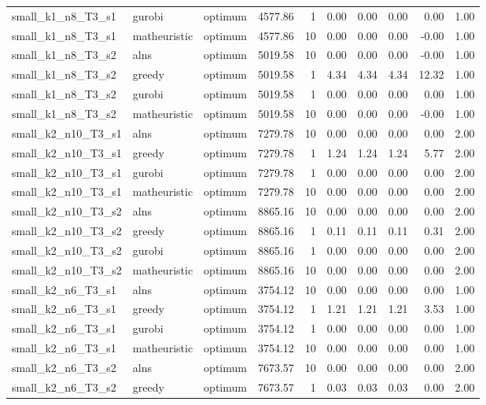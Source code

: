 \begin{tabular}{lllrrrrrrr}
small\_k1\_n8\_T3\_s1 & gurobi & optimum & 4577.86 & 1 & 0.00 & 0.00 & 0.00 & 0.00 & 1.00 \\
small\_k1\_n8\_T3\_s1 & matheuristic & optimum & 4577.86 & 10 & 0.00 & 0.00 & 0.00 & -0.00 & 1.00 \\
small\_k1\_n8\_T3\_s2 & alns & optimum & 5019.58 & 10 & 0.00 & 0.00 & 0.00 & -0.00 & 1.00 \\
small\_k1\_n8\_T3\_s2 & greedy & optimum & 5019.58 & 1 & 4.34 & 4.34 & 4.34 & 12.32 & 1.00 \\
small\_k1\_n8\_T3\_s2 & gurobi & optimum & 5019.58 & 1 & 0.00 & 0.00 & 0.00 & 0.00 & 1.00 \\
small\_k1\_n8\_T3\_s2 & matheuristic & optimum & 5019.58 & 10 & 0.00 & 0.00 & 0.00 & -0.00 & 1.00 \\
small\_k2\_n10\_T3\_s1 & alns & optimum & 7279.78 & 10 & 0.00 & 0.00 & 0.00 & 0.00 & 2.00 \\
small\_k2\_n10\_T3\_s1 & greedy & optimum & 7279.78 & 1 & 1.24 & 1.24 & 1.24 & 5.77 & 2.00 \\
small\_k2\_n10\_T3\_s1 & gurobi & optimum & 7279.78 & 1 & 0.00 & 0.00 & 0.00 & 0.00 & 2.00 \\
small\_k2\_n10\_T3\_s1 & matheuristic & optimum & 7279.78 & 10 & 0.00 & 0.00 & 0.00 & 0.00 & 2.00 \\
small\_k2\_n10\_T3\_s2 & alns & optimum & 8865.16 & 10 & 0.00 & 0.00 & 0.00 & 0.00 & 2.00 \\
small\_k2\_n10\_T3\_s2 & greedy & optimum & 8865.16 & 1 & 0.11 & 0.11 & 0.11 & 0.31 & 2.00 \\
small\_k2\_n10\_T3\_s2 & gurobi & optimum & 8865.16 & 1 & 0.00 & 0.00 & 0.00 & 0.00 & 2.00 \\
small\_k2\_n10\_T3\_s2 & matheuristic & optimum & 8865.16 & 10 & 0.00 & 0.00 & 0.00 & 0.00 & 2.00 \\
small\_k2\_n6\_T3\_s1 & alns & optimum & 3754.12 & 10 & 0.00 & 0.00 & 0.00 & 0.00 & 1.00 \\
small\_k2\_n6\_T3\_s1 & greedy & optimum & 3754.12 & 1 & 1.21 & 1.21 & 1.21 & 3.53 & 1.00 \\
small\_k2\_n6\_T3\_s1 & gurobi & optimum & 3754.12 & 1 & 0.00 & 0.00 & 0.00 & 0.00 & 1.00 \\
small\_k2\_n6\_T3\_s1 & matheuristic & optimum & 3754.12 & 10 & 0.00 & 0.00 & 0.00 & 0.00 & 1.00 \\
small\_k2\_n6\_T3\_s2 & alns & optimum & 7673.57 & 10 & 0.00 & 0.00 & 0.00 & 0.00 & 2.00 \\
small\_k2\_n6\_T3\_s2 & greedy & optimum & 7673.57 & 1 & 0.03 & 0.03 & 0.03 & 0.00 & 2.00 \\

\end{tabular}
